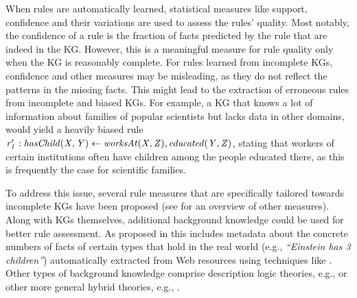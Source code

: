 When rules are automatically learned, statistical measures like support, confidence and their variations are used to assess the rules' quality. Most notably, the confidence of a rule is the fraction of facts predicted by the rule that are indeed in the KG. However, this is a meaningful measure for rule quality only when the KG is reasonably complete. For rules learned from incomplete KGs, confidence and other measures may be misleading, as they do not reflect the patterns in the missing facts. This might lead to the extraction of erroneous rules from incomplete and biased KGs. For example, a KG that knows a lot of information about families of popular scientists but lacks data in other domains, would yield a heavily biased rule $\mathit{r_1':hasChild(X,Y)\leftarrow worksAt(X,Z), educated(Y,Z)}$, stating that workers of certain institutions often have children among the people educated there, as this is frequently the case for scientific families. 

To address this issue, several rule measures that are specifically tailored towards incomplete KGs have been proposed \cite{amie,DBLP:conf/www/ZupancD18} (see \cite{metrics-summary,Azevedo2007} for an overview of other measures). 
Along with KGs themselves, additional background knowledge could be used for better rule assessment. As proposed in \cite{carl} this includes metadata about the concrete numbers of facts of certain types that hold in the real world (e.g., \emph{``Einstein has 3 children''}) automatically extracted from Web resources using techniques like  \cite{paramita-acl-2017}. Other types of background knowledge comprise description logic theories, e.g., \cite{d2016ontology} or other more general hybrid theories, e.g., \cite{DBLP:journals/tplp/Lisi10,DBLP:journals/tplp/JozefowskaLL10}.


